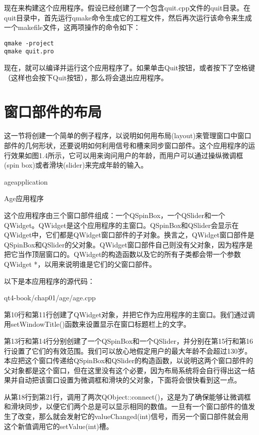 \documentclass[11pt,oneside]{book}
\begin{document}
\begin{common-format}
现在来构建这个应用程序。假设已经创建了一个包含quit.cpp文件的quit目录。在quit目录中，首先运行qmake命令生成它的工程文件，然后再次运行该命令来生成一个makefile文件，这两项操作的命令如下：
\begin{Verbatim}
qmake -project
qmake quit.pro
\end{Verbatim}

现在，就可以编译并运行这个应用程序了。如果单击Quit按钮，或者按下了空格键（这样也会按下Quit按钮），那么将会退出应用程序。


\section{窗口部件的布局}
这一节将创建一个简单的例子程序，以说明如何用布局(layout)来管理窗口中窗口部件的几何形状，还要说明如何利用信号和槽来同步窗口部件。这个应用程序的运行效果如图1.4所示，它可以用来询问用户的年龄，而用户可以通过操纵微调框(spin box)或者滑块(slider)来完成年龄的输入。
\begin{fig}{ageapplication}
\caption{Age应用程序}
\label{fig:ageapplication}
\end{fig}

这个应用程序由三个窗口部件组成：一个QSpinBox，一个QSlider和一个QWidget。QWidget是这个应用程序的主窗口。QSpinBox和QSlider会显示在QWidget中，它们都是QWidget窗口部件的子对象。换言之，QWidget窗口部件是QSpinBox和QSlider的父对象。QWidget窗口部件自己则没有父对象，因为程序是把它当作顶层窗口的。QWidget的构造函数以及它的所有子类都会带一个参数QWidget *，以用来说明谁是它们的父窗口部件。

以下是本应用程序的源代码：
\begin{cppinput}{qt4-book/chap01/age/age.cpp}
\end{cppinput}

第10行和第11行创建了QWidget对象，并把它作为应用程序的主窗口。我们通过调用setWindowTitle()函数来设置显示在窗口标题栏上的文字。

第13行和第14行分别创建了一个QSpinBox和一个QSlider，并分别在第15行和第16行设置了它们的有效范围。我们可以放心地假定用户的最大年龄不会超过130岁。本应把这个窗口传递给QSpinBox和QSlider的构造函数，以说明这两个窗口部件的父对象都是这个窗口，但在这里没有这个必要，因为布局系统将会自行得出这一结果并自动把该窗口设置为微调框和滑块的父对象，下面将会很快看到这一点。

从第18行到第21行，调用了两次QObject::connect()，这是为了确保能够让微调框和滑块同步，以便它们两个总是可以显示相同的数值。一旦有一个窗口部件的值发生了改变，那么就会发射它的valueChanged(int)信号，而另一个窗口部件就会用这个新值调用它的setValue(int)槽。


\end{common-format}
\end{document}
